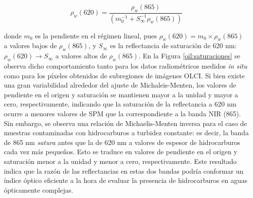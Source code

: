         \begin{equation}
            \rho_{w}(620) = \frac{\rho_{w}(865)}{(m_{0}^{-1} + S_{\infty}^{-1}\rho_{w}(865))}
            \label{oil:eq:michaelis}
        \end{equation}
    
        \noindent
        donde $m_{0}$ es la pendiente en el régimen lineal, pues $\rho_{w}(620) = m_{0} \times \rho_{w}(865)$ a valores bajos de $\rho_{w}(865)$, y $S_{\infty}$ es la reflectancia de saturación de 620 nm: $\rho_{w}(620) \rightarrow S_{\infty}$ a valores altos de $\rho_{w}(865)$. En la Figura \ref{oil:saturaciones} se observa dicho comportamiento tanto para los datos radiométricos medidos \textit{in situ} como para los píxeles obtenidos de subregiones de imágenes OLCI. Si bien existe una gran variabilidad alrededor del ajuste de Michaleis-Menten, los valores de pendiente en el origen y saturación se mantienen mayor a la unidad y mayor a cero, respectivamente, indicando que la saturación de la reflectancia a 620 nm ocurre a menores valores de SPM que la correspondiente a la banda NIR (865).
        Sin embargo, se observa una relación de Michaelis-Menten inversa para el caso de muestras contaminadas con hidrocarburos a turbidez constante: es decir, la banda de 865 nm \textit{satura} antes que la de 620 nm a valores de espesor de hidrocarburos cada vez más pequeños. Esto se traduce en valores de pendiente en el origen y saturación menor a la unidad y menor a cero, respectivamente. Este resultado indica que la razón de las reflectancias en estas dos bandas podría conformar un índice óptico eficiente a la hora de evaluar la presencia de hidrocarburos en aguas ópticamente complejas.%
        
